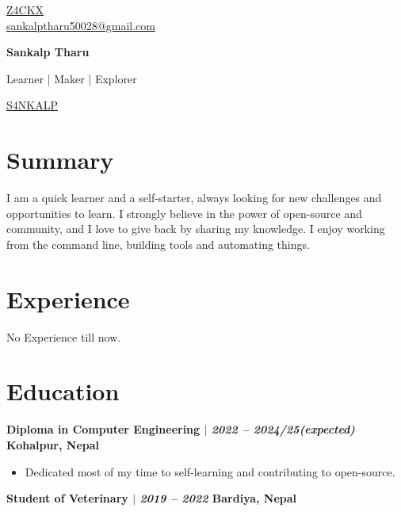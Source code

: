\documentclass[11pt]{article} %
\newcommand{\uthree}[4]{
    {\large
        {\bfseries #1 $|$ \textit{#2} \hfill #3} \par
    }
    \begin{itemize}
        #4
    \end{itemize}
    \par\addvspace{2.5ex}%
}
\begin{document}
\begin{multicols}{3}
  \begin{flushleft}
    \color{gray}{\faGithub} \href{https://github.com/S4NKALP}{Z4CKX} \\
    \color{gray}{\faEnvelope} \href{mailto:sankalptharu50028@gmail.com}{sankalptharu50028@gmail.com} \\
  \end{flushleft}

\columnbreak

  \begin{center}
      {\huge\bfseries Sankalp Tharu} \par
      Learner | Maker | Explorer \par
  \end{center}

\columnbreak

  \begin{flushright}
    \href{https://linkedin.com/in/S4NKALP/}{S4NKALP} {\color{gray}{\faLinkedin}} \\

  \end{flushright}
\end{multicols}

\section{Summary}

I am a quick learner and a self-starter, always looking for new challenges and opportunities to learn.
I strongly believe in the power of open-source and community, and I love to give back by sharing my knowledge.
I enjoy working from the command line, building tools and automating things.

\section{Experience}
No Experience till now.


\section{Education}
\uthree{Diploma in Computer Engineering}{2022 -- 2024/25(expected)}{Kohalpur, Nepal}{
    \item Dedicated most of my time to self-learning and contributing to open-source.
}
\uthree{Student of Veterinary}{2019 -- 2022}{Bardiya, Nepal}{}
\end{document}
